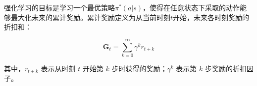 





强化学习的目标是学习一个最优策略$\pi^{*}(a|s)$，使得在任意状态下采取的动作能够最大化未来的累计奖励。累计奖励定义为从当前时刻$t$开始，未来各时刻奖励的折扣和：

\begin{equation}
	\label{eq:reward}
	\boldsymbol{G}_t = \sum_{k=0}^{\infty} \gamma^k r_{t+k}
\end{equation}

其中，\( r_{t+k} \) 表示从时刻 \( t \) 开始第 \( k \) 步时获得的奖励；\( \gamma^k \) 表示第 \( k \) 步奖励的折扣因子。



